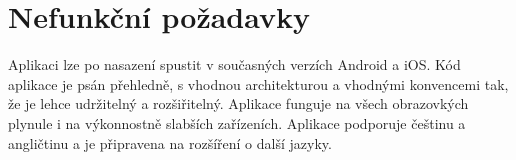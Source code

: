 \section{Nefunkční požadavky}

\begin{enumerate}[label=\textbf{N\arabic*}, ref=N\arabic*]
Aplikaci lze po nasazení spustit v současných verzích Android a iOS.
Kód aplikace je psán přehledně,
s vhodnou architekturou a vhodnými konvencemi tak,
že je lehce udržitelný a rozšiřitelný.
Aplikace funguje na všech obrazovkých plynule
i na výkonnostně slabších zařízeních.
Aplikace podporuje češtinu a angličtinu
a je připravena na rozšíření o další jazyky.
\end{enumerate}
